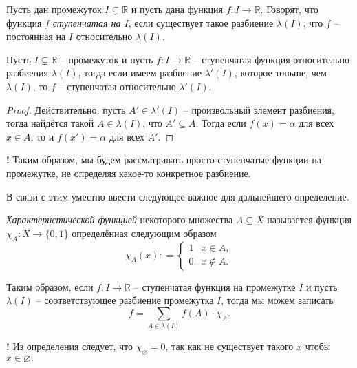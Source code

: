 \begin{definition}
    Пусть дан промежуток $I \subsetneq \mathbb{R}$ и пусть дана функция $f: I \to \mathbb{R}$. Говорят, что функция $f$ \textit{ступенчатая на $I$}, если существует такое разбиение $\lambda(I)$, что $f$ -- постоянная на $I$ относительно $\lambda(I).$
\end{definition}


\begin{lemma}\label{fiber_for_functions}
  Пусть $I \subsetneq \mathbb{R}$ -- промежуток и пусть $f:I \to \mathbb{R}$ -- ступенчатая функция относительно разбиения $\lambda(I)$, тогда если имеем разбиение $\lambda'(I)$, которое тоньше, чем $\lambda(I)$, то $f$ -- ступенчатая относительно $\lambda'(I).$ 
\end{lemma}

\begin{proof}
    Действительно, пусть $A' \in \lambda'(I)$ -- произвольный элемент разбиения, тогда найдётся такой $A \in \lambda(I)$, что $A' \subseteq A$. Тогда если $f(x) = \alpha$ для всех $x \in A$, то и $f(x') = \alpha$ для всех $A'.$
\end{proof}

\begin{mydanger}{\bf !}
    Таким образом, мы будем рассматривать просто ступенчатые функции на промежутке, не определяя какое-то конкретное разбиение.
\end{mydanger}


В связи с этим уместно ввести следующее важное для дальнейшего определение.

\begin{definition}
    \textit{Характеристической функцией} некоторого множества $A \subseteq X$ называется функция $\chi_A: X\to \{0,1\}$ определённая следующим образом
    \[
     \chi_A(x): = \begin{cases}
         1 & x \in A, \\
         0 & x \notin A.
     \end{cases}
    \]
\end{definition}

\begin{remark}
 Таким образом, если $f: I \to \mathbb{R}$ -- ступенчатая функция на промежутке $I$ и пусть $\lambda(I)$ -- соответствующее разбиение промежутка $I$, тогда мы можем записать
 \[
  f =\sum_{A \in \lambda(I)} f(A) \cdot \chi_A.
 \]
\end{remark}

\begin{mydanger}{\bf !}
    Из определения следует, что $\chi_{\varnothing} = 0$, так как не существует такого $x$ чтобы $x \in \varnothing.$
\end{mydanger}


